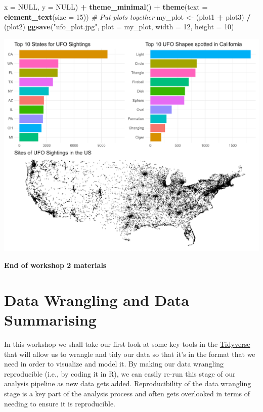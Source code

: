 \documentclass[
]{book}
\newenvironment{Shaded}{\begin{snugshade}}{\end{snugshade}}
\newcommand{\AttributeTok}[1]{\textcolor[rgb]{0.13,0.29,0.53}{#1}}
\newcommand{\CommentTok}[1]{\textcolor[rgb]{0.56,0.35,0.01}{\textit{#1}}}
\newcommand{\ConstantTok}[1]{\textcolor[rgb]{0.56,0.35,0.01}{#1}}
\newcommand{\DecValTok}[1]{\textcolor[rgb]{0.00,0.00,0.81}{#1}}
\newcommand{\FunctionTok}[1]{\textcolor[rgb]{0.13,0.29,0.53}{\textbf{#1}}}
\newcommand{\NormalTok}[1]{#1}
\newcommand{\OtherTok}[1]{\textcolor[rgb]{0.56,0.35,0.01}{#1}}
\newcommand{\SpecialCharTok}[1]{\textcolor[rgb]{0.81,0.36,0.00}{\textbf{#1}}}
\newcommand{\StringTok}[1]{\textcolor[rgb]{0.31,0.60,0.02}{#1}}
\begin{document}
\begin{Shaded}
\begin{Highlighting}[]
       \AttributeTok{x =} \ConstantTok{NULL}\NormalTok{, }
       \AttributeTok{y =} \ConstantTok{NULL}\NormalTok{) }\SpecialCharTok{+}
  \FunctionTok{theme\_minimal}\NormalTok{() }\SpecialCharTok{+}
  \FunctionTok{theme}\NormalTok{(}\AttributeTok{text =} \FunctionTok{element\_text}\NormalTok{(}\AttributeTok{size =} \DecValTok{15}\NormalTok{))}
\CommentTok{\# Put plots together}
\NormalTok{my\_plot }\OtherTok{\textless{}{-}}\NormalTok{ (plot1 }\SpecialCharTok{+}\NormalTok{ plot3) }\SpecialCharTok{/}\NormalTok{ (plot2)}
\FunctionTok{ggsave}\NormalTok{(}\StringTok{"ufo\_plot.jpg"}\NormalTok{, }\AttributeTok{plot =}\NormalTok{ my\_plot, }\AttributeTok{width =} \DecValTok{12}\NormalTok{, }\AttributeTok{height =} \DecValTok{10}\NormalTok{)}
\end{Highlighting}
\end{Shaded}

{\includegraphics{images/ufo_plot.jpg}}

\textbf{End of workshop 2 materials}

\hypertarget{data-wrangling-and-data-summarising}{%
\chapter{Data Wrangling and Data Summarising}\label{data-wrangling-and-data-summarising}}

In this workshop we shall take our first look at some key tools in the \href{https://www.tidyverse.org}{Tidyverse} that will allow us to wrangle and tidy our data so that it's in the format that we need in order to visualize and model it. By making our data wrangling reproducible (i.e., by coding it in R), we can easily re-run this stage of our analysis pipeline as new data gets added. Reproducibility of the data wrangling stage is a key part of the analysis process and often gets overlooked in terms of needing to ensure it is reproducible.
\end{document}
